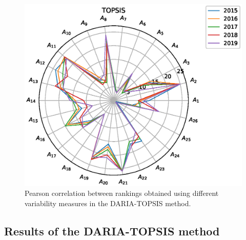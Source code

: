\documentclass[5p,times]{elsarticle}
\begin{document}
\begin{figure}[H]
    \centering
    \includegraphics[width=\linewidth]{radar_topsis.eps}
    \caption{Pearson correlation between rankings obtained using different variability measures in the DARIA-TOPSIS method.}
    \label{fig:radarTOPSIS}
\end{figure}

\subsection{Results of the DARIA-TOPSIS method}
\end{document}

